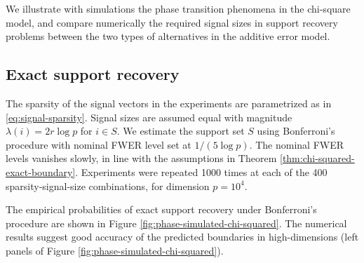 We illustrate with simulations the phase transition phenomena in the chi-square model, and compare numerically the required signal sizes in support recovery problems between the two types of alternatives in the additive error model.

\subsection{Exact support recovery}

The sparsity of the signal vectors in the experiments are parametrized as in \eqref{eq:signal-sparsity}. 
Signal sizes are assumed equal with magnitude $\lambda(i)=2r\log{p}$ for $i\in S$.
We estimate the support set $S$ using Bonferroni's procedure with nominal FWER level set at $1/(5{\log{p}})$.
The nominal FWER levels vanishes slowly, in line with the assumptions in Theorem \ref{thm:chi-squared-exact-boundary}.
Experiments were repeated 1000 times at each of the 400 sparsity-signal-size combinations, 
for dimension $p=10^4$.

The empirical probabilities of exact support recovery under Bonferroni's procedure are shown in Figure \ref{fig:phase-simulated-chi-squared}.
The numerical results suggest good accuracy of the predicted boundaries in high-dimensions 
(left panels of Figure \ref{fig:phase-simulated-chi-squared}).

